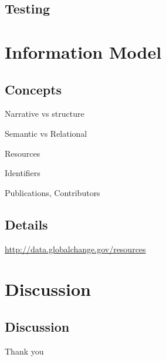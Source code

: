 \documentclass{beamer}
\begin{document}
\subsection{Testing}


\section{Information Model}
\subsection{Concepts}
\begin{frame}
    \begin{center}
        \Huge Narrative vs structure
    \end{center}
\end{frame}

\begin{frame}
    \begin{center}
        \Huge Semantic vs Relational
    \end{center}
\end{frame}

\begin{frame}
    \begin{center}
        \Huge Resources
    \end{center}
\end{frame}

\begin{frame}
    \begin{center}
        \Huge Identifiers
    \end{center}
\end{frame}

\begin{frame}
    \begin{center}
        \Huge Publications, Contributors
    \end{center}
\end{frame}

\subsection{Details}
\begin{frame}
    \begin{center}
        \url{http://data.globalchange.gov/resources}
    \end{center}
\end{frame}

\section{Discussion}
\subsection{Discussion}
\begin{frame}
    \begin{center}
        Thank you
    \end{center}
\end{frame}
\end{document}
